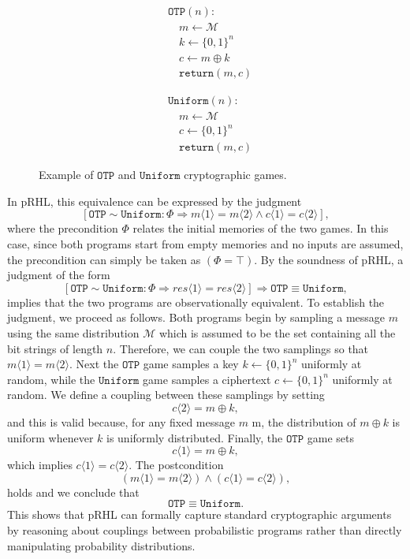 \begin{figure}[htpb]
    \centering
    \begin{minipage}[t]{0.25\textwidth}
    \begin{align*}
    &\mathtt{OTP}(n): \\
    &\quad m \gets \mathcal{M} \\
    &\quad k \gets \{0,1\}^n \\
    &\quad c \gets m \oplus k \\
    &\quad \mathtt{return} (m,c)
    \end{align*}
    \end{minipage}
    \hspace{2em}
    \begin{minipage}[t]{0.25\textwidth}
    \begin{align*}
    &\mathtt{Uniform}(n): \\
    &\quad m \gets \mathcal{M} \\
    &\quad c \gets \{0,1\}^n \\
    &\quad \mathtt{return} (m,c)
    \end{align*}
    \end{minipage}
    \caption{Example of $\mathtt{OTP}$ and $\mathtt{Uniform}$ cryptographic games.}
    \label{fig:easycrypt-sample-proof}
\end{figure}
In pRHL, this equivalence can be expressed by the judgment
\[
[\mathtt{OTP} \sim \mathtt{Uniform}: \Phi \Longrightarrow m\langle1\rangle = m\langle2\rangle \land c\langle1\rangle = c\langle2\rangle ],
\]
where the precondition $\Phi$ relates the initial memories of the two games. In this case, since both programs start from empty memories and no inputs are assumed, the precondition can simply be taken as $(\Phi = \top)$. By the soundness of pRHL, a judgment of the form
\[[\mathtt{OTP} \sim \mathtt{Uniform}: \Phi \Longrightarrow res\langle1\rangle = res\langle2\rangle] \Longrightarrow \mathtt{OTP} \equiv \mathtt{Uniform},
\]
implies that the two programs are observationally equivalent. To establish the judgment, we proceed as follows. Both programs begin by sampling a message $m$ using the same distribution $\mathcal{M}$ which is assumed to be the set containing all the bit strings of length $n$. Therefore, we can couple the two samplings so that  $m\langle1\rangle=m\langle2\rangle$. Next the $\mathtt{OTP}$ game samples a key $k \gets \{0,1\}^n$ uniformly at random, while the $\mathtt{Uniform}$ game samples a ciphertext $c \gets \{0,1\}^n$ uniformly at random. We define a coupling between these samplings by setting
\[
c\langle2\rangle = m \oplus k,
\]
and this is valid because, for any fixed message $m$
m, the distribution of  $m\oplus k$ is uniform whenever $k$ is uniformly distributed. Finally, the $\mathtt{OTP}$ game sets
\[
c\langle1\rangle = m \oplus k,
\]
which implies $c\langle1\rangle = c\langle2\rangle$. The postcondition 
\[
(m\langle1\rangle = m\langle2\rangle) \land (c\langle1\rangle = c\langle2\rangle),
\]
holds and we conclude that
\[
\mathtt{OTP} \equiv \mathtt{Uniform}.
\]
This shows that pRHL can formally capture standard cryptographic arguments by reasoning about couplings between probabilistic programs rather than directly manipulating probability distributions.

